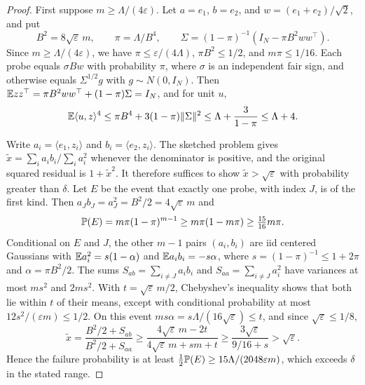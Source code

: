 \documentclass[11pt,a4paper]{article}
\theoremstyle{definition}\newtheorem{definition}[theorem]{Definition}
\theoremstyle{remark}\newtheorem{remark}[theorem]{Remark}
\numberwithin{equation}{section}
\newcommand{\norm}[1]{\lVert#1\rVert}\newcommand{\ip}[2]{\langle#1,#2\rangle}
\begin{document}
\begin{proof}
First suppose $m\ge\Lambda/(4\varepsilon)$. Let $a=e_1$, $b=e_2$, and $w=(e_1+e_2)/\sqrt2$, and put
\[
 B^2=8\sqrt\varepsilon\,m,\qquad\pi=\Lambda/B^4,\qquad
 \Sigma=(1-\pi)^{-1}(I_N-\pi B^2ww^\top).
\]
Since $m\ge\Lambda/(4\varepsilon)$, we have $\pi\le\varepsilon/(4\Lambda)$,
$\pi B^2\le1/2$, and $m\pi\le1/16$. Each probe equals $\sigma Bw$ with
probability $\pi$, where $\sigma$ is an independent fair sign, and
otherwise equals $\Sigma^{1/2}g$ with $g\sim N(0,I_N)$. Then
$\mathbb E zz^\top=\pi B^2ww^\top+(1-\pi)\Sigma=I_N$, and for unit $u$,
\[
 \E\ip uz^4\le\pi B^4+3(1-\pi)\norm\Sigma^2
 \le\Lambda+\frac3{1-\pi}\le\Lambda+4.
\]

Write $a_i=\ip{e_1}{z_i}$ and $b_i=\ip{e_2}{z_i}$. The sketched problem
gives $\widetilde x=\sum_ia_ib_i/\sum_ia_i^2$ whenever the denominator is
positive, and the original squared residual is $1+\widetilde x^2$. It
therefore suffices to show $\widetilde x>\sqrt\varepsilon$ with probability
greater than $\delta$. Let $E$ be the event that exactly one probe, with
index $J$, is of the first kind. Then
$a_Jb_J=a_J^2=B^2/2=4\sqrt\varepsilon\,m$ and
\[
 \mathbb P(E)=m\pi(1-\pi)^{m-1}\ge m\pi(1-m\pi)\ge\tfrac{15}{16}m\pi.
\]
Conditional on $E$ and $J$, the other $m-1$ pairs $(a_i,b_i)$ are iid
centered Gaussians with $\mathbb E a_i^2=s(1-\alpha)$ and $\mathbb E a_ib_i=-s\alpha$,
where $s=(1-\pi)^{-1}\le1+2\pi$ and $\alpha=\pi B^2/2$. The sums
$S_{ab}=\sum_{i\ne J}a_ib_i$ and $S_{aa}=\sum_{i\ne J}a_i^2$ have
variances at most $ms^2$ and $2ms^2$. With $t=\sqrt\varepsilon\,m/2$,
Chebyshev's inequality shows that both lie within $t$ of their means,
except with conditional probability at most $12s^2/(\varepsilon m)\le1/2$.
On this event $ms\alpha=s\Lambda/(16\sqrt\varepsilon)\le t$, and since
$\sqrt\varepsilon\le1/8$,
\[
 \widetilde x=\frac{B^2/2+S_{ab}}{B^2/2+S_{aa}}
 \ge\frac{4\sqrt\varepsilon\,m-2t}{4\sqrt\varepsilon\,m+sm+t}
 \ge\frac{3\sqrt\varepsilon}{9/16+s}>\sqrt\varepsilon.
\]
Hence the failure probability is at least
$\tfrac12\mathbb P(E)\ge15\Lambda/(2048\varepsilon m)$, which exceeds $\delta$
in the stated range.



\end{proof}
\end{document}
